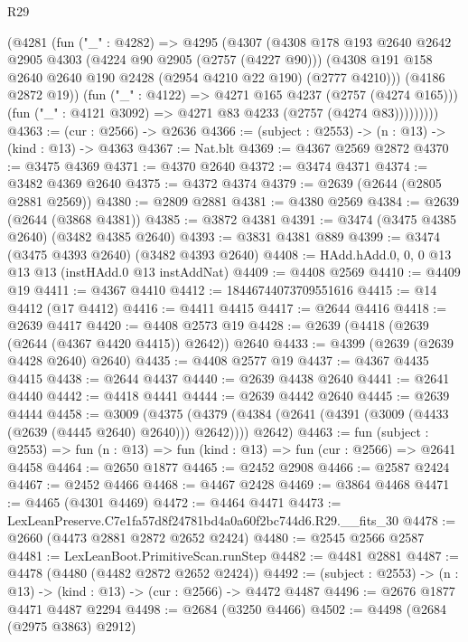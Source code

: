 \begin{lexlean}{R29}
\begin{coremodule}
            (@4281
              (fun ("_" : @4282) =>
              @4295
                (@4307
                  (@4308
                    @178
                    @193
                    @2640
                    @2642
                    @2905
                    @4303
                    (@4224 @90 @2905 (@2757 (@4227 @90)))
                    (@4308 @191 @158 @2640 @2640 @190 @2428 (@2954 @4210 @22 @190) (@2777 @4210)))
                  (@4186 @2872 @19))
                (fun ("_" : @4122) => @4271 @165 @4237 (@2757 (@4274 @165)))
                (fun ("_" : @4121 @3092) => @4271 @83 @4233 (@2757 (@4274 @83)))))))))
@4363 := (cur : @2566) -> @2636
@4366 := (subject : @2553) -> (n : @13) -> (kind : @13) -> @4363
@4367 := Nat.blt
@4369 := @4367 @2569 @2872
@4370 := @3475 @4369
@4371 := @4370 @2640
@4372 := @3474 @4371
@4374 := @3482 @4369 @2640
@4375 := @4372 @4374
@4379 := @2639 (@2644 (@2805 @2881 @2569))
@4380 := @2809 @2881
@4381 := @4380 @2569
@4384 := @2639 (@2644 (@3868 @4381))
@4385 := @3872 @4381
@4391 := @3474 (@3475 @4385 @2640) (@3482 @4385 @2640)
@4393 := @3831 @4381 @889
@4399 := @3474 (@3475 @4393 @2640) (@3482 @4393 @2640)
@4408 := HAdd.hAdd.{0, 0, 0} @13 @13 @13 (instHAdd.{0} @13 instAddNat)
@4409 := @4408 @2569
@4410 := @4409 @19
@4411 := @4367 @4410
@4412 := 18446744073709551616
@4415 := @14 @4412 (@17 @4412)
@4416 := @4411 @4415
@4417 := @2644 @4416
@4418 := @2639 @4417
@4420 := @4408 @2573 @19
@4428 := @2639 (@4418 (@2639 (@2644 (@4367 @4420 @4415)) @2642)) @2640
@4433 := @4399 (@2639 (@2639 @4428 @2640) @2640)
@4435 := @4408 @2577 @19
@4437 := @4367 @4435 @4415
@4438 := @2644 @4437
@4440 := @2639 @4438 @2640
@4441 := @2641 @4440
@4442 := @4418 @4441
@4444 := @2639 @4442 @2640
@4445 := @2639 @4444
@4458 := @3009
    (@4375 (@4379 (@4384 (@2641 (@4391 (@3009 (@4433 (@2639 (@4445 @2640) @2640))) @2642)))) @2642)
@4463 := fun (subject : @2553) =>
  fun (n : @13) => fun (kind : @13) => fun (cur : @2566) => @2641 @4458
@4464 := @2650 @1877
@4465 := @2452 @2908
@4466 := @2587 @2424
@4467 := @2452 @4466
@4468 := @4467 @2428
@4469 := @3864 @4468
@4471 := @4465 (@4301 @4469)
@4472 := @4464 @4471
@4473 := LexLeanPreserve.C7e1fa57d8f24781bd4a0a60f2bc744d6.R29.__fits_30
@4478 := @2660 (@4473 @2881 @2872 @2652 @2424)
@4480 := @2545 @2566 @2587
@4481 := LexLeanBoot.PrimitiveScan.runStep
@4482 := @4481 @2881
@4487 := @4478 (@4480 (@4482 @2872 @2652 @2424))
@4492 := (subject : @2553) -> (n : @13) -> (kind : @13) -> (cur : @2566) -> @4472 @4487
@4496 := @2676 @1877 @4471 @4487 @2294
@4498 := @2684 (@3250 @4466)
@4502 := @4498 (@2684 (@2975 @3863) @2912)

\end{coremodule}
\end{lexlean}

